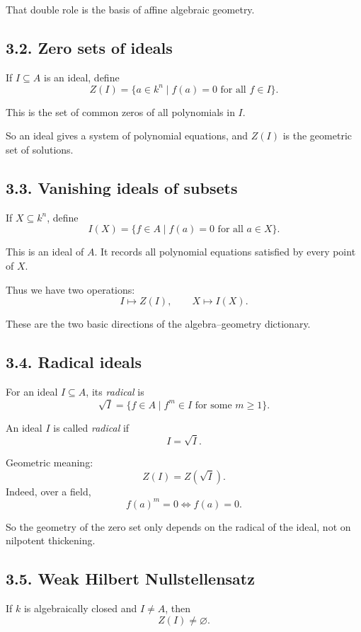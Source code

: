\documentclass[12pt,a4paper]{article}
\theoremstyle{plain}
\theoremstyle{definition}      %
\begin{document}
That double role is the basis of affine algebraic geometry.

\subsection*{3.2. Zero sets of ideals}

If \(I\subseteq A\) is an ideal, define
\[
Z(I)=\{a\in k^n \mid f(a)=0\text{ for all }f\in I\}.
\]

This is the set of common zeros of all polynomials in \(I\).

So an ideal gives a system of polynomial equations, and \(Z(I)\) is the geometric set of solutions.

\subsection*{3.3. Vanishing ideals of subsets}

If \(X\subseteq k^n\), define
\[
I(X)=\{f\in A\mid f(a)=0\text{ for all }a\in X\}.
\]

This is an ideal of \(A\). It records all polynomial equations satisfied by every point of \(X\).

Thus we have two operations:
\[
I \mapsto Z(I),\qquad X \mapsto I(X).
\]

These are the two basic directions of the algebra--geometry dictionary.

\subsection*{3.4. Radical ideals}

For an ideal \(I\subseteq A\), its \emph{radical} is
\[
\sqrt{I}
=
\{f\in A\mid f^m\in I\text{ for some }m\ge 1\}.
\]

An ideal \(I\) is called \emph{radical} if
\[
I=\sqrt{I}.
\]

Geometric meaning:
\[
Z(I)=Z(\sqrt{I}).
\]
Indeed, over a field,
\[
f(a)^m=0 \iff f(a)=0.
\]

So the geometry of the zero set only depends on the radical of the ideal, not on nilpotent thickening.

\subsection*{3.5. Weak Hilbert Nullstellensatz}

If \(k\) is algebraically closed and \(I\neq A\), then
\[
Z(I)\neq \varnothing.
\]
\end{document}
